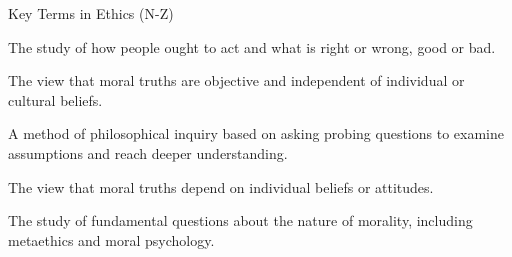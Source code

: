 \documentclass[aspectratio=169]{beamer}
\begin{document}
\begin{frame}{Key Terms in Ethics (N-Z)}
\begin{description}[leftmargin=!,labelwidth=\widthof{\bfseries Theoretical}]
\item[\textbf{Normative Ethics}] The study of how people ought to act and what is right or wrong, good or bad.

\item[\textbf{Objectivism}] The view that moral truths are objective and independent of individual or cultural beliefs.

\item[\textbf{Socratic Method}] A method of philosophical inquiry based on asking probing questions to examine assumptions and reach deeper understanding.

\item[\textbf{Subjectivism}] The view that moral truths depend on individual beliefs or attitudes.

\item[\textbf{Theoretical Ethics}] The study of fundamental questions about the nature of morality, including metaethics and moral psychology.
\end{description}
\end{frame}
\end{document}
